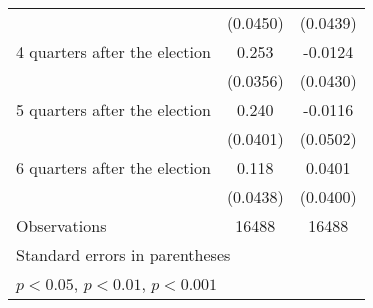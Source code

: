 \begin{table}[htbp]
\begin{tabular}{l*{2}{c}}
                    &    (0.0450)         &    (0.0439)         \\
[1em]
 4 quarters after the election&       0.253\sym{***}&     -0.0124         \\
                    &    (0.0356)         &    (0.0430)         \\
[1em]
 5 quarters after the election&       0.240\sym{***}&     -0.0116         \\
                    &    (0.0401)         &    (0.0502)         \\
[1em]
 6 quarters after the election&       0.118\sym{**} &      0.0401         \\
                    &    (0.0438)         &    (0.0400)         \\
\hline
Observations        &       16488         &       16488         \\
\hline\hline
\multicolumn{3}{l}{\footnotesize Standard errors in parentheses}\\
\multicolumn{3}{l}{\footnotesize \sym{*} \(p<0.05\), \sym{**} \(p<0.01\), \sym{***} \(p<0.001\)}\\
\end{tabular}
\end{table}
